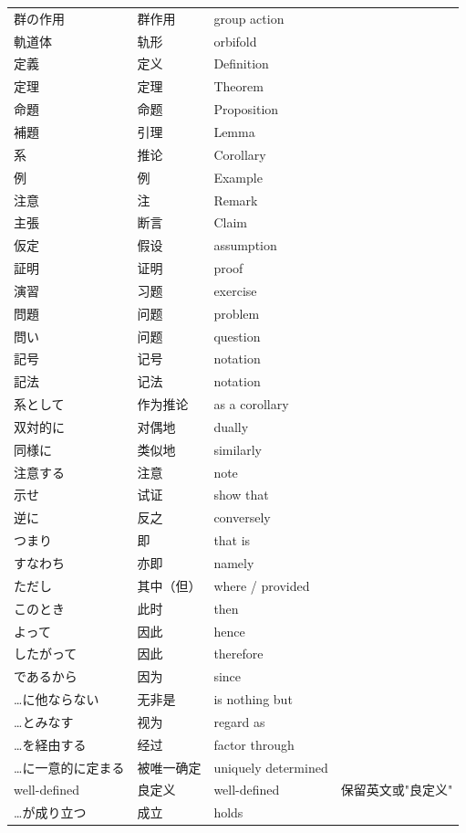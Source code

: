 \begin{longtable}{p{}p{}p{}p{}}
群の作用 & 群作用 & group action &  \\
軌道体 & 轨形 & orbifold &  \\
定義 & 定义 & Definition &  \\
定理 & 定理 & Theorem &  \\
命題 & 命题 & Proposition &  \\
補題 & 引理 & Lemma &  \\
系 & 推论 & Corollary &  \\
例 & 例 & Example &  \\
注意 & 注 & Remark &  \\
主張 & 断言 & Claim &  \\
仮定 & 假设 & assumption &  \\
証明 & 证明 & proof &  \\
演習 & 习题 & exercise &  \\
問題 & 问题 & problem &  \\
問い & 问题 & question &  \\
記号 & 记号 & notation &  \\
記法 & 记法 & notation &  \\
系として & 作为推论 & as a corollary &  \\
双対的に & 对偶地 & dually &  \\
同様に & 类似地 & similarly &  \\
注意する & 注意 & note &  \\
示せ & 试证 & show that &  \\
逆に & 反之 & conversely &  \\
つまり & 即 & that is &  \\
すなわち & 亦即 & namely &  \\
ただし & 其中（但） & where / provided &  \\
このとき & 此时 & then &  \\
よって & 因此 & hence &  \\
したがって & 因此 & therefore &  \\
であるから & 因为 & since &  \\
…に他ならない & 无非是 & is nothing but &  \\
…とみなす & 视为 & regard as &  \\
…を経由する & 经过 & factor through &  \\
…に一意的に定まる & 被唯一确定 & uniquely determined &  \\
well-defined & 良定义 & well-defined & 保留英文或"良定义" \\
…が成り立つ & 成立 & holds &  \\

\end{longtable}
